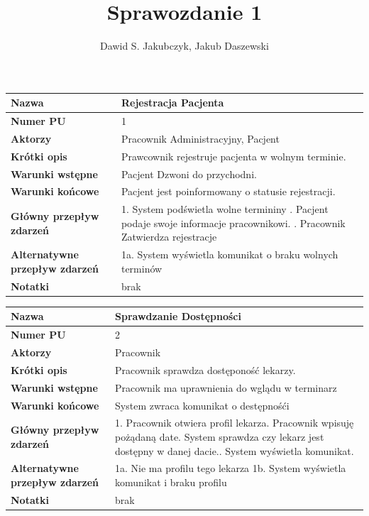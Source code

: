 \documentclass{article}
\title{Sprawozdanie 1}
\author{Dawid S. Jakubczyk, Jakub Daszewski}
\date{}
\begin{document}
    \maketitle
	\begin{tabular}{|m{10em}|m{30em}|}
	\hline
	\textbf{Nazwa} & Rejestracja Pacjenta \\
	\hline
	\textbf{Numer PU} & 1 \\
	\hline
	\textbf{Aktorzy} & Pracownik Administracyjny, Pacjent \\
	\hline
	\textbf{Krótki opis} & Prawcownik rejestruje pacjenta w wolnym terminie. \\
	\hline
	\textbf{Warunki wstępne} & Pacjent Dzwoni do przychodni. \\
	\hline
	\textbf{Warunki końcowe} & Pacjent jest poinformowany o statusie rejestracji.\\
	\hline
	\textbf{Główny przepływ zdarzeń} & 
		1. System podświetla wolne termininy \newline
		2. Pacjent podaje swoje informacje pracownikowi. \newline
		3. Pracownik Zatwierdza rejestracje   \\
	\hline
	\textbf{Alternatywne przepływ zdarzeń} & 1a. System wyświetla komunikat o braku wolnych terminów\\
	\hline 
	\textbf{Notatki} & brak \\
	\hline
	\end{tabular}
	
    \vspace{1cm}
    
    \begin{tabular}{|m{10em}|m{30em}|}
    	\hline
    	\textbf{Nazwa} & Sprawdzanie Dostępności  \\
    	\hline
    	\textbf{Numer PU} & 2 \\
    	\hline
    	\textbf{Aktorzy} & Pracownik \\
    	\hline
    	\textbf{Krótki opis} & Pracownik sprawdza dostęponość lekarzy. \\
    	\hline
    	\textbf{Warunki wstępne} & Pracownik ma uprawnienia do wglądu w terminarz \\
    	\hline
    	\textbf{Warunki końcowe} &  System zwraca komunikat o  destępnośći\\
    	\hline
    	\textbf{Główny przepływ zdarzeń} & 
    	1. Pracownik otwiera profil lekarza\newline
    	2. Pracownik wpisuję pożądaną date.\newline
    	3  System sprawdza czy lekarz jest dostępny w danej dacie.\newline
    	4. System wyświetla komunikat.\\
    	\hline
    	\textbf{Alternatywne przepływ zdarzeń} & 1a. Nie ma profilu tego lekarza \newline
    											 1b. System wyświetla komunikat i braku profilu\\
    	\hline 
    	\textbf{Notatki} & brak \\
    	\hline
    \end{tabular}
    
\end{document}
